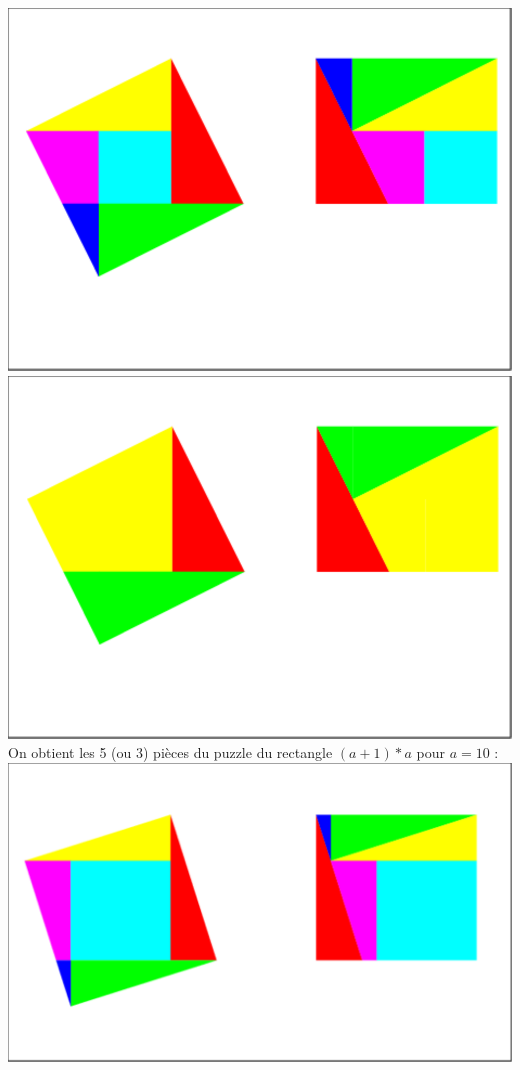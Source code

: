 \documentclass[a4paper,11pt]{book}
\begin{document}
\includegraphics[width=\textwidth]{carresqrta}\\
\includegraphics[width=\textwidth]{carresqrta0}\\
On obtient les 5 (ou 3) pi\`eces du puzzle du rectangle $(a+1)*a$ pour $a=10$ :\\
\includegraphics[width=\textwidth]{carresqrta1}
\end{document}
